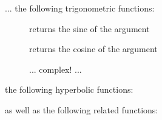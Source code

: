 ... the following trigonometric functions:
\begin{description}
  \item[]{returns the sine of the argument}
  \item[]{returns the cosine of the argument}
  \item[]{}
  \item[]{}
  \item[]{}
  \item[]{... complex! ...}
\end{description}
the following hyperbolic functions:
\begin{description}
  \item[]{}
  \item[]{}
  \item[]{}
\end{description}
as well as the following related functions:
\begin{description}
  \item[]{}
\end{description}

\begin{description}
  \item[]{}
  \item[]{}
  \item[]{}
  \item[]{}
\end{description}

\begin{description}
  \item[]{}
  \item[]{}
  \item[]{}
\end{description}







